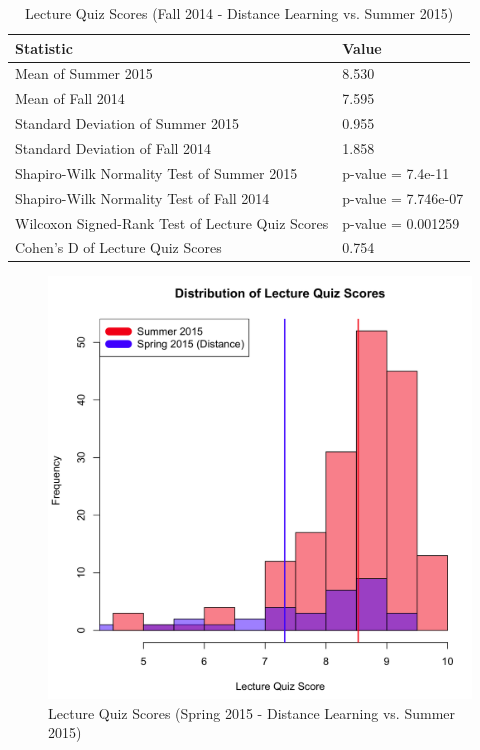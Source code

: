 \pagebreak\clearpage

\begin{small}
\begin{table}
  \centering
  \begin{tabular}{|l|l|}
    \hline
    \textbf{Statistic} & \textbf{Value} \\
	\hline
	Mean of Summer 2015 & 8.530 \\
	\hline
	Mean of Fall 2014 & 7.595 \\
	\hline
	Standard Deviation of Summer 2015 & 0.955 \\
	\hline
	Standard Deviation of Fall 2014 & 1.858 \\
	\hline
	Shapiro-Wilk Normality Test of Summer 2015 & p-value = 7.4e-11 \\
	\hline
	Shapiro-Wilk Normality Test of Fall 2014 & p-value = 7.746e-07 \\
	\hline
	Wilcoxon Signed-Rank Test of Lecture Quiz Scores & p-value = 0.001259 \\
	\hline
	Cohen's D of Lecture Quiz Scores & 0.754 \\
	\hline
  \end{tabular}
	\caption{Lecture Quiz Scores (Fall 2014 - Distance Learning vs. Summer 2015)}
  \label{tab:lqf14dSu15}
\end{table}
\end{small}

\pagebreak\clearpage

\begin{figure}
	\centering
	\includegraphics[width=5in]{img/chapter4/lq_su15_vs_sp15d}
	\caption{Lecture Quiz Scores (Spring 2015 - Distance Learning vs. Summer 2015)}
  \label{fig:rqSp15dSu15}
\end{figure}


